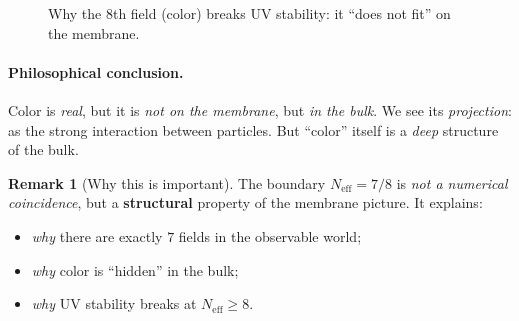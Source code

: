 \documentclass[11pt,a4paper]{article}
\newcommand{\SU}{\mathrm{SU}}
\newcommand{\Om}{\Omega^4}
\newcommand{\Neff}{N_{\text{eff}}}
\newcommand{\Hone}{H\textsubscript{1}}
\newcommand{\Htwo}{H\textsubscript{2}}
\theoremstyle{definition}
\newtheorem{remark}[theorem]{Remark}
\begin{document}
\begin{figure}[htbp]
\centering
{}
\caption{Why the 8th field (color) breaks UV stability: it 
``does not fit'' on the membrane.}
\label{fig:eighth-field}
\end{figure}

\paragraph{Philosophical conclusion.}
Color is \emph{real}, but it is \emph{not on the membrane}, but 
\emph{in the bulk}. We see its \emph{projection}: as the strong 
interaction between particles. But ``color'' itself is a 
\emph{deep} structure of the bulk.

\begin{remark}[Why this is important]
\label{rem:why-important-8}
The boundary $\Neff = 7/8$ is \emph{not a numerical coincidence}, but a 
\textbf{structural} property of the membrane picture. It 
explains:
\begin{itemize}
    \item \emph{why} there are exactly $7$ fields in the observable world;
    \item \emph{why} color is ``hidden'' in the bulk;
    \item \emph{why} UV stability breaks at 
          $\Neff \ge 8$.
\end{itemize}
\end{remark}
\end{document}
